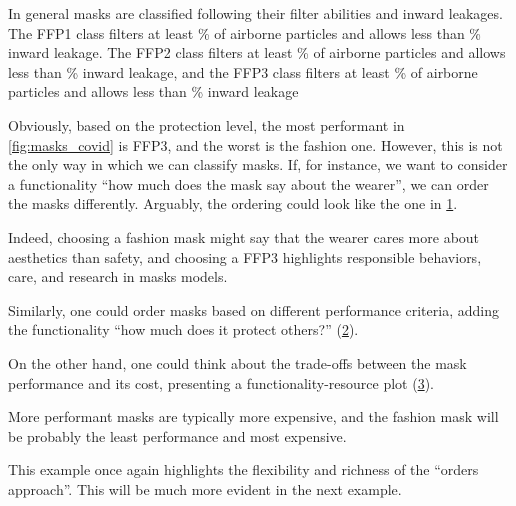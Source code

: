 In general masks are classified following their filter abilities and inward leakages.
The FFP1 class filters at least \unit[80]{\%} of airborne particles and allows less than \unit[22]{\%} inward leakage.
The FFP2 class filters at least \unit[96]{\%} of airborne particles and allows less than \unit[8]{\%} inward leakage, and the FFP3 class filters at least \unit[99]{\%} of airborne particles and allows less than \unit[2]{\%} inward leakage

Obviously, based on the protection level, the most performant in \cref{fig:masks_covid} is FFP3, and the worst is the fashion one.
However, this is not the only way in which we can classify masks.
If, for instance, we want to consider a functionality ``how much does the mask say about the wearer'', we can order the masks differently.
Arguably, the ordering could look like the one in \cref{fig:masks_expressive}.

\begin{figure}[h!]
    \centering
    \caption{}
    \label{fig:masks_expressive}
\end{figure}

Indeed, choosing a fashion mask might say that the wearer cares more about aesthetics than safety, and choosing a FFP3 highlights responsible behaviors, care, and research in masks models.

Similarly, one could order masks based on different performance criteria, adding the functionality ``how much does it protect others?'' (\cref{fig:masks_others}).

\begin{figure}[h!]
    \centering
    \caption{}
    \label{fig:masks_others}
\end{figure}

On the other hand, one could think about the trade-offs between the mask performance and its cost, presenting a functionality-resource plot (\cref{fig:masks_price}).

\begin{figure}[h!]
    \centering
    \caption{}
    \label{fig:masks_price}
\end{figure}

More performant masks are typically more expensive, and the fashion mask will be probably the least performance and most expensive.

This example once again highlights the flexibility and richness of the ``orders approach''.
This will be much more evident in the next example.

